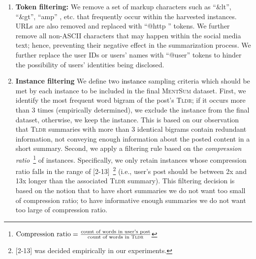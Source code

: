 \documentclass[10pt, a4paper]{article}
\newcommand{\tldr}{\textsc{Tldr}}
\newcommand{\mentsum}{\textsc{MentSum}}
\begin{document}
\begin{enumerate}
    \item \textbf{Token filtering:} We remove a set of markup characters such as ``{\selectfont \&lt}'', ``{\selectfont \&gt}'', ``{\selectfont amp}''
, etc. that frequently occur within the harvested instances. URLs are also removed and replaced with ``{\selectfont @http }'' tokens. We further remove all non-ASCII characters that may happen within the social media text; hence, preventing their negative effect in the summarization process. We further replace the user IDs or users' names with ``{\selectfont @user}'' tokens to hinder the possibility of users' identities being disclosed. 
    
    \item \textbf{Instance filtering
} We define two \textcolor{black}{instance} sampling criteria  which should be met by each instance to be included in the final \mentsum{} dataset. First, we identify the most frequent word bigram of the post's \tldr{}; if it occurs more than 3 times (empirically determined), we exclude the instance from the final dataset, otherwise, we keep the instance. This is based on our observation that \tldr{} summaries with more than 3 identical bigrams contain redundant information, not conveying enough information about the posted content in a short summary. Second, we apply a filtering rule based on the \textit{compression ratio}~\footnote{$\text{Compression ratio} =  \frac{\text{count of words in user's post}}{\text{count of words in \tldr}}$} of  instances. Specifically, we only retain instances whose compression ratio falls in the range of [2-13]~\footnote{[2-13] was decided empirically in our experiments.} (i.e., user's post should be between 2x and 13x longer than the associated \tldr{} summary). This filtering decision is based on the notion that to have short summaries we do not want too small of compression ratio;  to have informative enough summaries we do not want too large of compression ratio.


\end{enumerate}
\end{document}
